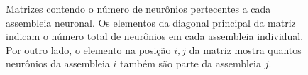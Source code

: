 \begin{figure}[!ht]
\caption{Matrizes contendo o número de neurônios pertecentes a cada assembleia neuronal. Os elementos da diagonal principal da
matriz indicam o número total de neurônios em cada assembleia individual. Por outro lado, o elemento na posição $i,j$ da matriz
mostra quantos neurônios da assembleia $i$ também são parte da assembleia $j$.}

\end{figure}

